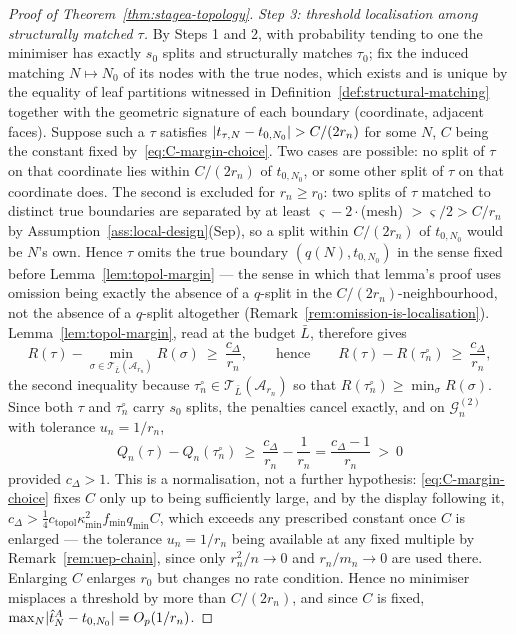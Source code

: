 \documentclass[11pt]{article}
\theoremstyle{plain}
\theoremstyle{definition}
\theoremstyle{remark}
\newcommand{\cA}{\mathcal{A}}
\newcommand{\cT}{\mathcal{T}}
\DeclarePairedDelimiter{\abs}{\lvert}{\rvert}
\begin{document}
\begin{proof}[Proof of Theorem~\ref{thm:stagea-topology}]
\emph{Step 3: threshold localisation among structurally matched \(\tau\).}
By Steps 1 and 2, with probability tending to one the minimiser has exactly
\(s_0\) splits and structurally matches \(\tau_0\); fix the induced matching
\(N\mapsto N_0\) of its nodes with the true nodes, which exists and is unique
by the equality of leaf partitions witnessed in
Definition~\ref{def:structural-matching} together with the geometric signature
of each boundary (coordinate, adjacent faces). Suppose such a \(\tau\)
satisfies \(\abs{t_{\tau,N}-t_{0,N_0}}>C/(2r_n)\) for some \(N\), \(C\) being
the constant fixed by~\eqref{eq:C-margin-choice}. Two cases are possible: no
split of \(\tau\) on that coordinate lies within \(C/(2r_n)\) of
\(t_{0,N_0}\), or some other split of \(\tau\) on that coordinate does. The
second is excluded for \(r_n\ge r_0\): two splits of \(\tau\) matched to
distinct true boundaries are separated by at least
\(\varsigma-2\cdot\)(mesh) \(>\varsigma/2>C/r_n\) by
Assumption~\ref{ass:local-design}(Sep), so a split within \(C/(2r_n)\) of
\(t_{0,N_0}\) would be \(N\)'s own. Hence \(\tau\) omits the true boundary
\((q(N),t_{0,N_0})\) in the sense fixed before
Lemma~\ref{lem:topol-margin} --- the sense in which that lemma's proof uses
omission being exactly the absence of a \(q\)-split in the
\(C/(2r_n)\)-neighbourhood, not the absence of a \(q\)-split altogether
(Remark~\ref{rem:omission-is-localisation}). Lemma~\ref{lem:topol-margin},
read at the budget \(\bar L\), therefore gives
\[
  R(\tau)-\min_{\sigma\in\cT_{\bar L}(\cA_{r_n})}R(\sigma)
  \ \ge\
  \frac{c_\Delta}{r_n},
  \qquad\text{hence}\qquad
  R(\tau)-R(\tau_n^\circ)\ \ge\ \frac{c_\Delta}{r_n},
\]
the second inequality because \(\tau_n^\circ\in\cT_{\bar L}(\cA_{r_n})\) so
that \(R(\tau_n^\circ)\ge\min_\sigma R(\sigma)\). Since both \(\tau\) and
\(\tau_n^\circ\) carry \(s_0\) splits, the penalties cancel exactly, and on
\(\mathcal{G}_n^{(2)}\) with tolerance \(u_n=1/r_n\),
\[
  Q_n(\tau)-Q_n(\tau_n^\circ)
  \ \ge\
  \frac{c_\Delta}{r_n}-\frac1{r_n}
  =
  \frac{c_\Delta-1}{r_n}
  \ >\ 0
\]
provided \(c_\Delta>1\). This is a normalisation, not a further hypothesis:
\eqref{eq:C-margin-choice} fixes \(C\) only up to being sufficiently large,
and by the display following it, \(c_\Delta>\tfrac14c_{\mathrm{topol}}
\kappa_{\min}^2f_{\min}q_{\min}C\), which exceeds any prescribed constant once
\(C\) is enlarged --- the tolerance \(u_n=1/r_n\) being available at any fixed
multiple by Remark~\ref{rem:uep-chain}, since only \(r_n^2/n\to0\) and
\(r_n/m_n\to0\) are used there. Enlarging \(C\) enlarges \(r_0\) but changes
no rate condition. Hence no minimiser misplaces a threshold by more than
\(C/(2r_n)\), and since \(C\) is fixed,
\(\max_N\abs{\hat t^A_N-t_{0,N_0}}=O_p(1/r_n)\).


\end{proof}
\end{document}
